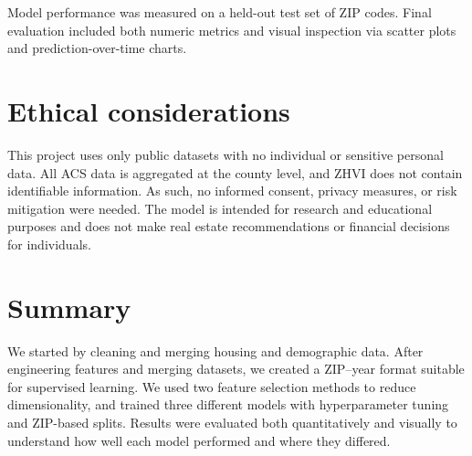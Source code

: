Model performance was measured on a held-out test set of ZIP codes. Final evaluation included both numeric metrics and visual inspection via scatter plots and prediction-over-time charts.

\section{Ethical considerations}
This project uses only public datasets with no individual or sensitive personal data. All ACS data is aggregated at the county level, and ZHVI does not contain identifiable information. As such, no informed consent, privacy measures, or risk mitigation were needed. The model is intended for research and educational purposes and does not make real estate recommendations or financial decisions for individuals.

\section{Summary}
We started by cleaning and merging housing and demographic data. After engineering features and merging datasets, we created a ZIP–year format suitable for supervised learning. We used two feature selection methods to reduce dimensionality, and trained three different models with hyperparameter tuning and ZIP-based splits. Results were evaluated both quantitatively and visually to understand how well each model performed and where they differed.
